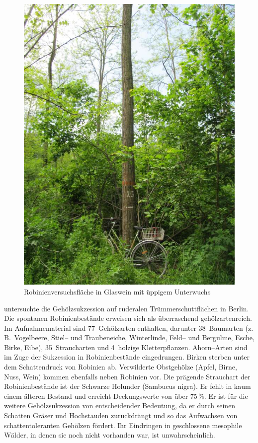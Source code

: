 \documentclass[twocolumn]{scrartcl}
\begin{document}
\begin{figure}[htbp]
  \centering
  \includegraphics[width=.9\linewidth]{./bild/GlasweinRobinie2023a}
  \caption{Robinienversuchsfläche in Glaswein mit üppigem Unterwuchs}
  \label{fig:glaswein}
\end{figure}

\citet{kowarik1990robinie} untersuchte die Gehölzsukzession auf
ruderalen Trümmerschuttflächen in Berlin. Die spontanen
Robinienbestände erweisen sich als überraschend gehölzartenreich. Im
Aufnahmematerial sind 77~Gehölzarten enthalten, darunter 38~Baumarten
(z.\,B.\ Vogelbeere, Stiel-- und Traubeneiche, Winterlinde, Feld-- und
Bergulme, Esche, Birke, Eibe), 35~Straucharten und 4~holzige
Kletterpflanzen. Ahorn--Arten sind im Zuge der Sukzession in
Robinienbestände eingedrungen. Birken sterben unter dem Schattendruck
von Robinien ab. Verwilderte Obstgehölze (Apfel, Birne, Nuss, Wein)
kommen ebenfalls neben Robinien vor. Die prägende Strauchart der
Robinienbestände ist der Schwarze Holunder (Sambucus nigra). Er fehlt
in kaum einem älteren Bestand und erreicht Deckungswerte von über
75\,\%. Er ist für die weitere Gehölzsukzession von entscheidender
Bedeutung, da er durch seinen Schatten Gräser und Hochstauden
zuruckdrängt und so das Aufwachsen von schattentoleranten Gehölzen
fördert. Ihr Eindringen in geschlossene mesophile Wälder, in denen sie
noch nicht vorhanden war, ist unwahrscheinlich.
\end{document}
